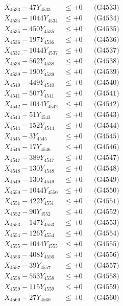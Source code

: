 \documentclass[a4paper,10pt]{article}
\begin{document}
{\begin{align}
X_{4533} - 47Y_{4533} &\leq +0 && \text{(G4533)} \\
X_{4534} - 1044Y_{4534} &\leq +0 && \text{(G4534)} \\
X_{4535} - 450Y_{4535} &\leq +0 && \text{(G4535)} \\
X_{4536} - 197Y_{4536} &\leq +0 && \text{(G4536)} \\
X_{4537} - 1044Y_{4537} &\leq +0 && \text{(G4537)} \\
X_{4538} - 562Y_{4538} &\leq +0 && \text{(G4538)} \\
X_{4539} - 190Y_{4539} &\leq +0 && \text{(G4539)} \\
X_{4540} - 449Y_{4540} &\leq +0 && \text{(G4540)} \\
\allowbreak
X_{4541} - 507Y_{4541} &\leq +0 && \text{(G4541)} \\
X_{4542} - 1044Y_{4542} &\leq +0 && \text{(G4542)} \\
X_{4543} - 51Y_{4543} &\leq +0 && \text{(G4543)} \\
X_{4544} - 152Y_{4544} &\leq +0 && \text{(G4544)} \\
X_{4545} - 3Y_{4545} &\leq +0 && \text{(G4545)} \\
X_{4546} - 17Y_{4546} &\leq +0 && \text{(G4546)} \\
X_{4547} - 389Y_{4547} &\leq +0 && \text{(G4547)} \\
X_{4548} - 130Y_{4548} &\leq +0 && \text{(G4548)} \\
X_{4549} - 130Y_{4549} &\leq +0 && \text{(G4549)} \\
X_{4550} - 1044Y_{4550} &\leq +0 && \text{(G4550)} \\
\allowbreak
X_{4551} - 422Y_{4551} &\leq +0 && \text{(G4551)} \\
X_{4552} - 90Y_{4552} &\leq +0 && \text{(G4552)} \\
X_{4553} - 147Y_{4553} &\leq +0 && \text{(G4553)} \\
X_{4554} - 126Y_{4554} &\leq +0 && \text{(G4554)} \\
X_{4555} - 1044Y_{4555} &\leq +0 && \text{(G4555)} \\
X_{4556} - 408Y_{4556} &\leq +0 && \text{(G4556)} \\
X_{4557} - 39Y_{4557} &\leq +0 && \text{(G4557)} \\
X_{4558} - 553Y_{4558} &\leq +0 && \text{(G4558)} \\
X_{4559} - 115Y_{4559} &\leq +0 && \text{(G4559)} \\
X_{4560} - 27Y_{4560} &\leq +0 && \text{(G4560)} \\

\end{align}}
\end{document}
